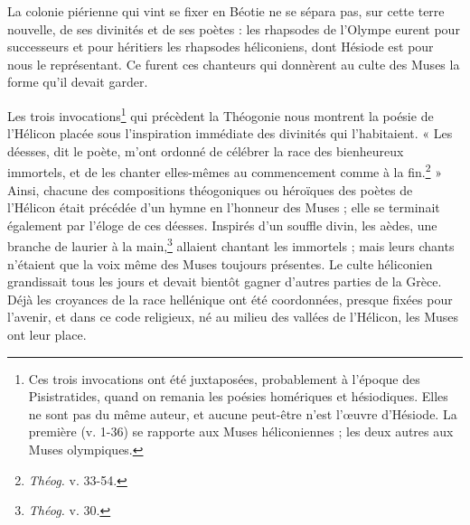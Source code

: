 \documentclass[a4paper, 11pt, oneside, polutonikogreek, french]{article}
\begin{document}
La colonie piérienne qui vint se fixer en Béotie ne se sépara pas, sur cette terre nouvelle, de ses divinités et de ses poètes : les rhapsodes de l'Olympe eurent pour successeurs et pour héritiers les rhapsodes héliconiens, dont Hésiode est pour nous le représentant. Ce furent ces chanteurs qui donnèrent au culte des Muses la forme qu'il devait garder.

Les trois invocations\footnote{Ces trois invocations ont été juxtaposées, probablement à l'époque des Pisistratides, quand on remania les poésies homériques et hésiodiques. Elles ne sont pas du même auteur, et aucune peut-être n'est l'œuvre d'Hésiode. La première (v. 1-36) se rapporte aux Muses héliconiennes ; les deux autres aux Muses olympiques.} qui précèdent la Théogonie nous montrent la poésie de l'Hélicon placée sous l'inspiration immédiate des divinités qui l'habitaient. « Les déesses, dit le poète, m'ont ordonné de célébrer la race des bienheureux immortels, et de les chanter elles-mêmes au commencement comme à la fin.\footnote{\emph{Théog.} v. 33-54.} » Ainsi, chacune des compositions théogoniques ou héroïques des poètes de l'Hélicon était précédée d'un hymne en l'honneur des Muses ; elle se terminait également par l'éloge de ces déesses. Inspirés d'un souffle divin, les aèdes, une branche de laurier à la main,\footnote{\emph{Théog.} v. 30.} allaient chantant les immortels ; mais leurs chants n'étaient que la voix même des Muses toujours présentes. Le culte héliconien grandissait tous les jours et devait bientôt gagner d'autres parties de la Grèce. Déjà les croyances de la race hellénique ont été coordonnées, presque fixées pour l'avenir, et dans ce code religieux, né au milieu des vallées de l'Hélicon, les Muses ont leur place.
\end{document}
